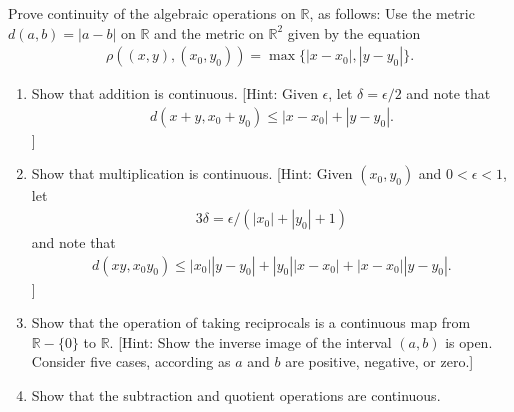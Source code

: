   \begin{exercise}[Munkres 21.12]
    Prove continuity of the algebraic operations on $\mathbb{R}$, as follows: Use the metric $d(a, b) = |a - b|$ on $\mathbb{R}$ and the metric on $\mathbb{R}^2$ given by the equation
    \begin{align*}
      \rho((x, y), (x_0, y_0)) = \max\{|x - x_0|, |y - y_0|\}.
    \end{align*}
    \begin{enumerate} 
      \item[(a)] Show that addition is continuous. [Hint: Given $\epsilon$, let $\delta = \epsilon/2$ and note that 
      \begin{align*}
        d(x + y, x_0 + y_0) \leq |x - x_0| + |y - y_0|.
      \end{align*}
      ]
      \item[(b)] Show that multiplication is continuous. [Hint: Given $(x_0, y_0)$ and $0 < \epsilon < 1$, let 
      \begin{align*}
        3\delta = \epsilon/(|x_0| + |y_0| + 1)
      \end{align*}
      and note that
      \begin{align*}
        d(xy, x_0y_0) \leq |x_0||y - y_0| + |y_0||x - x_0| + |x - x_0||y - y_0|.
      \end{align*}
      ]
      \item[(c)] Show that the operation of taking reciprocals is a continuous map from $\mathbb{R} - \{0\}$ to $\mathbb{R}$. [Hint: Show the inverse image of the interval $(a, b)$ is open. Consider five cases, according as $a$ and $b$ are positive, negative, or zero.]
      \item[(d)] Show that the subtraction and quotient operations are continuous.
    \end{enumerate}
  \end{exercise}




